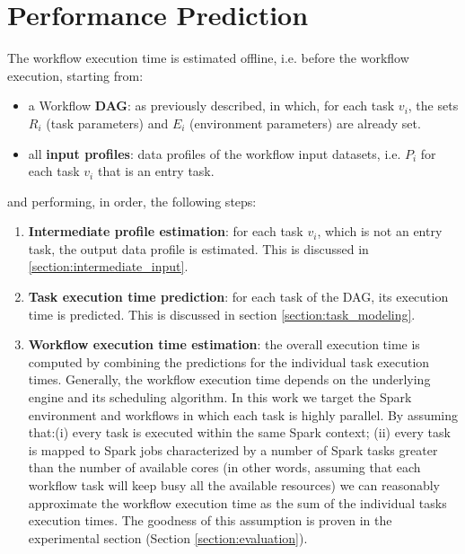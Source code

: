 \documentclass[a4paper, 10pt, conference]{ieeeconf}      %
\begin{document}
\section{Performance Prediction}
\label{subsec:pipeline}
The workflow execution time is estimated offline, i.e. before the workflow execution, starting from:
\begin{itemize}
    \item a Workflow \textbf{DAG}: as previously described, in which, for each task $v_i$, the sets $R_i$ (task parameters) and $E_i$ (environment parameters) are already set.
    \item all \textbf{input profiles}: data profiles of the workflow input datasets, i.e. $P_i$ for each task $v_i$ that is an entry task. 
\end{itemize}
and performing, in order, the following steps:
\begin{enumerate}
    \item \textbf{Intermediate profile estimation}: for each task $v_i$, which is not an entry task, the output data profile is estimated. This is discussed in \ref{section:intermediate_input}.
    \item \textbf{Task execution time prediction}: for each task of the DAG, its execution time is predicted. This is discussed in section \ref{section:task_modeling}.
     \item \textbf{Workflow execution time estimation}: the overall execution time is computed by combining the predictions for the individual task execution times. Generally, the workflow execution time depends on the underlying engine and its scheduling algorithm. In this work we target the Spark environment and workflows in which each task is highly parallel. By assuming that:(i) every task is executed within the same Spark context; (ii) every task is mapped to Spark jobs characterized by a number of Spark tasks greater than the number of available cores (in other words,  assuming that each workflow task will keep busy all the available resources) we can reasonably approximate the workflow  execution time as the sum of the individual tasks execution times. The goodness of this assumption is proven in the experimental section (Section \ref{section:evaluation}).
\end{enumerate}
\end{document}
